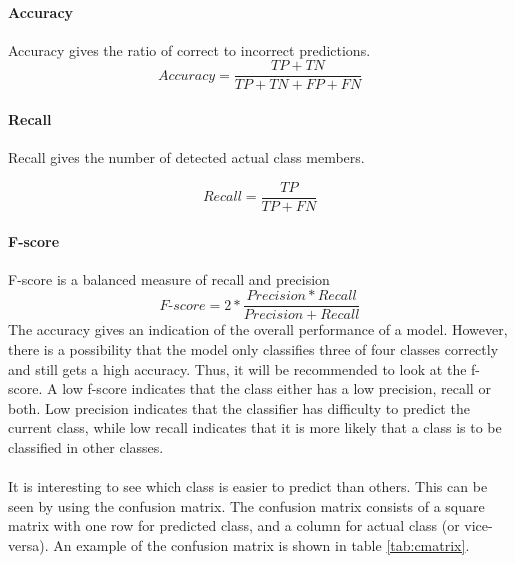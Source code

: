 \documentclass[USenglish]{ifimaster}  %
\begin{document}
	\paragraph{Accuracy}
	Accuracy gives the ratio of correct to incorrect predictions.
	\begin{equation}
	Accuracy = \frac{TP + TN}{TP + TN + FP + FN}
	\label{eq:acc}
	\end{equation}
	
	\paragraph{Recall}
	Recall gives the number of detected actual class members.
	
	\begin{equation}
	Recall = \frac{TP}{TP + FN}
	\label{eq:recall}
	\end{equation}
	
	\paragraph{F-score}
	F-score is a balanced measure of recall and precision 
	\begin{equation}
	\textit{F-score} = 2*\frac{Precision*Recall}{Precision + Recall}
	\label{eq:fscore}
	\end{equation}
	\FloatBarrier
The accuracy gives an indication of the overall performance of a model. However, there is a possibility that the model only classifies three of four classes correctly and still gets a high accuracy. Thus, it will be recommended to look at the f-score. A low f-score indicates that the class either has a low precision, recall or both. Low precision indicates that the classifier has difficulty to predict the current class, while low recall indicates that it is more likely that a class is to be classified in other classes.
\\
\\
It is interesting to see which class is easier to predict than others. This can be seen by using the confusion matrix. The confusion matrix consists of a square matrix with one row for predicted class, and a column for actual class (or vice-versa). An example of the confusion matrix is shown in table \ref{tab:cmatrix}.
	
\end{document}

